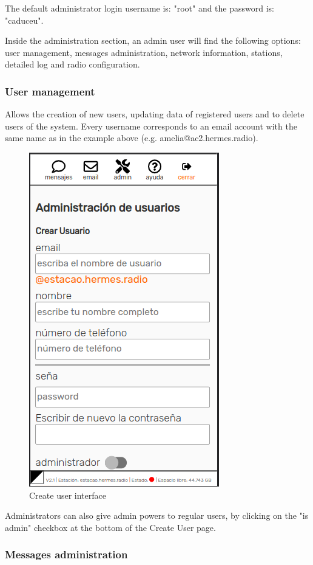 \documentclass[11pt,a4paper]{article}
\begin{document}
The default administrator login username is: "root" and the password is: "caduceu".

Inside the administration section, an admin user will find the following options: user management, messages administration, network information, stations, detailed log and radio configuration.

\subsubsection{User management} 

Allows the creation of new users, updating data of registered users and to delete users of the system. Every username corresponds to an email account with the same name as in the example above (e.g. amelia@ac2.hermes.radio). 
    
    \begin{figure}[H]
    \centering
    \includegraphics[width=0.5\columnwidth]{screenshots/frontend/es/createuser.png}
    \caption{Create user interface}
    \label{fig:createuser}
    \end{figure}
    
    Administrators can also give admin powers to regular users, by clicking on the "is admin" checkbox at the bottom of the Create User page.

\subsubsection{Messages administration}  
\label{gui_msg_admin}
\end{document}
